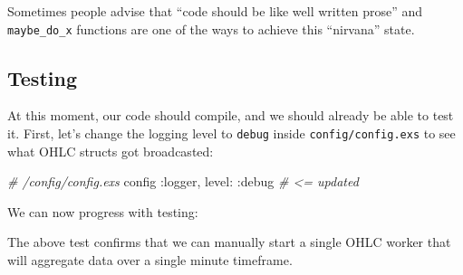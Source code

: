 \documentclass[
  oneside]{book}
\newenvironment{Shaded}{\begin{snugshade}}{\end{snugshade}}
\newcommand{\AttributeTok}[1]{\textcolor[rgb]{0.13,0.29,0.53}{#1}}
\newcommand{\CommentTok}[1]{\textcolor[rgb]{0.56,0.35,0.01}{\textit{#1}}}
\newcommand{\ErrorTok}[1]{\textcolor[rgb]{0.64,0.00,0.00}{\textbf{#1}}}
\newcommand{\ExtensionTok}[1]{#1}
\newcommand{\KeywordTok}[1]{\textcolor[rgb]{0.13,0.29,0.53}{\textbf{#1}}}
\newcommand{\NormalTok}[1]{#1}
\newcommand{\OperatorTok}[1]{\textcolor[rgb]{0.81,0.36,0.00}{\textbf{#1}}}
\newcommand{\PreprocessorTok}[1]{\textcolor[rgb]{0.56,0.35,0.01}{\textit{#1}}}
\newcommand{\SpecialStringTok}[1]{\textcolor[rgb]{0.31,0.60,0.02}{#1}}
\newcommand{\StringTok}[1]{\textcolor[rgb]{0.31,0.60,0.02}{#1}}
\newcommand{\VariableTok}[1]{\textcolor[rgb]{0.00,0.00,0.00}{#1}}
\begin{document}
Sometimes people advise that ``code should be like well written prose'' and \texttt{maybe\_do\_x} functions are one of the ways to achieve this ``nirvana'' state.

\subsection{Testing}\label{testing}

At this moment, our code should compile, and we should already be able to test it. First, let's change the logging level to \texttt{debug} inside \texttt{config/config.exs} to see what OHLC structs got broadcasted:

\begin{Shaded}
\begin{Highlighting}[]
\CommentTok{\# /config/config.exs}
\NormalTok{config }\VariableTok{:logger}\NormalTok{,}
  \VariableTok{level:} \VariableTok{:debug} \CommentTok{\# \textless{}= updated}
\end{Highlighting}
\end{Shaded}

We can now progress with testing:

\begin{Shaded}
\end{Shaded}

The above test confirms that we can manually start a single OHLC worker that will aggregate data over a single minute timeframe.
\end{document}
